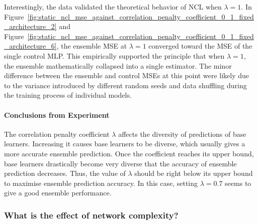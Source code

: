 \documentclass{article}
\begin{document}
Interestingly, the data validated the theoretical behavior of NCL when $\lambda = 1$. In Figure~\ref{fig:static_ncl_mse_against_correlation_penalty_coefficient_0_1_fixed_architecture_2} and Figure~\ref{fig:static_ncl_mse_against_correlation_penalty_coefficient_0_1_fixed_architecture_6}, the ensemble MSE at $\lambda = 1$ converged toward the MSE of the single control MLP. This empirically supported the principle that when $\lambda = 1$, the ensemble mathematically collapsed into a single estimator. The minor difference between the ensemble and control MSEs at this point were likely due to the variance introduced by different random seeds and data shuffling during the training process of individual models. 

\paragraph{Conclusions from Experiment}
The correlation penalty coefficient $\lambda$ affects the diversity of predictions of base learners. Increasing it causes base learners to be diverse, which usually gives a more accurate ensemble prediction. Once the coefficient reaches its upper bound, base learners drastically become very diverse that the accuracy of ensemble prediction decreases. Thus, the value of $\lambda$ should be right below its upper bound to maximise ensemble prediction accuracy. In this case, setting $\lambda = 0.7$ seems to give a good ensemble performance. 


\subsubsection{What is the effect of network complexity?}
\end{document}
